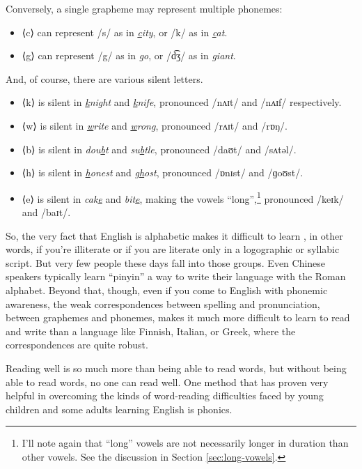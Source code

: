 Conversely, a single grapheme may represent multiple phonemes:
\begin{itemize}[noitemsep]
    \item ⟨c⟩ can represent /s/ as in \textit{\uline{c}ity}, or /k/ as in \textit{\uline{c}at}.
    \item ⟨g⟩ can represent /g/ as in \textit{\uline{g}o}, or /d͡ʒ/ as in \textit{\uline{g}iant}.
\end{itemize}
        
And, of course, there are various silent letters.

\begin{itemize}[noitemsep]
    \item ⟨k⟩ is silent in \textit{\uline{k}night} and \textit{\uline{k}nife}, pronounced /nʌɪt/ and /nʌɪf/ respectively.
    \item ⟨w⟩ is silent in \textit{\uline{w}rite} and \textit{\uline{w}rong}, pronounced /rʌɪt/ and /rɒŋ/.
    \item ⟨b⟩ is silent in \textit{dou\uline{b}t} and \textit{su\uline{b}tle}, pronounced /daʊt/ and /sʌtəl/.
    \item ⟨h⟩ is silent in \textit{\uline{h}onest} and \textit{g\uline{h}ost}, pronounced /ɒnɪst/ and /ɡoʊst/.
    \item ⟨e⟩ is silent in \textit{cak\uline{e}} and \textit{bit\uline{e}}, making the vowels ``long'',\footnote{I'll note again that ``long'' vowels are not necessarily longer in duration than other vowels. See the discussion in Section \ref{sec:long-vowels}.} pronounced /keɪk/ and /baɪt/.
\end{itemize}

So, the very fact that English is alphabetic makes it difficult to learn , in other words, if you're illiterate or if you are literate only in a logographic or syllabic script. But very few people these days fall into those groups. Even Chinese speakers typically learn ``pinyin'' a way to write their language with the Roman alphabet. Beyond that, though, even if you come to English with phonemic awareness, the weak correspondences between spelling and pronunciation, between graphemes and phonemes, makes it much more difficult to learn to read and write than a language like Finnish, Italian, or Greek, where the correspondences are quite robust.

Reading well is so much more than being able to read words, but without being able to read words, no one can read well. One method that has proven very helpful in overcoming the kinds of word-reading difficulties faced by young children and some adults learning English is phonics.

